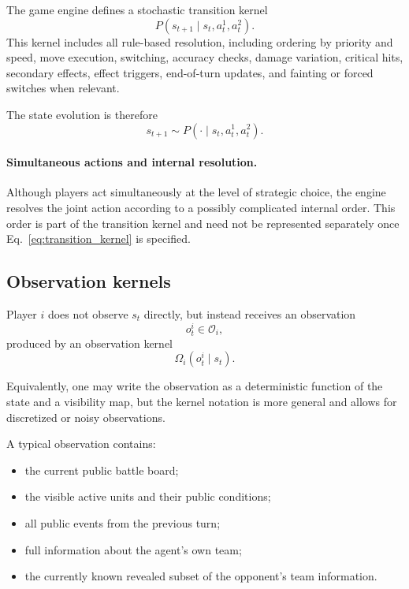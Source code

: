 \documentclass[aps,pre,twocolumn,superscriptaddress,nofootinbib]{revtex4-2}
\newcommand{\cO}{\mathcal{O}}
\theoremstyle{definition}
\theoremstyle{plain}
\begin{document}
The game engine defines a stochastic transition kernel
\begin{equation}
    P(s_{t+1}\mid s_t,a_t^1,a_t^2).
    \label{eq:transition_kernel}
\end{equation}
This kernel includes all rule-based resolution, including ordering by priority and speed, move execution, switching, accuracy checks, damage variation, critical hits, secondary effects, effect triggers, end-of-turn updates, and fainting or forced switches when relevant.

The state evolution is therefore
\begin{equation}
    s_{t+1} \sim P(\cdot\mid s_t,a_t^1,a_t^2).
\end{equation}

\paragraph{Simultaneous actions and internal resolution.}
Although players act simultaneously at the level of strategic choice, the engine resolves the joint action according to a possibly complicated internal order. This order is part of the transition kernel and need not be represented separately once Eq.~\eqref{eq:transition_kernel} is specified.

\subsection{Observation kernels}

Player $i$ does not observe $s_t$ directly, but instead receives an observation
\begin{equation}
    o_t^i \in \cO_i,
\end{equation}
produced by an observation kernel
\begin{equation}
    \Omega_i(o_t^i\mid s_t).
    \label{eq:obs_kernel}
\end{equation}

Equivalently, one may write the observation as a deterministic function of the state and a visibility map, but the kernel notation is more general and allows for discretized or noisy observations.

A typical observation contains:
\begin{itemize}
    \item the current public battle board;
    \item the visible active units and their public conditions;
    \item all public events from the previous turn;
    \item full information about the agent's own team;
    \item the currently known revealed subset of the opponent's team information.
\end{itemize}
\end{document}
